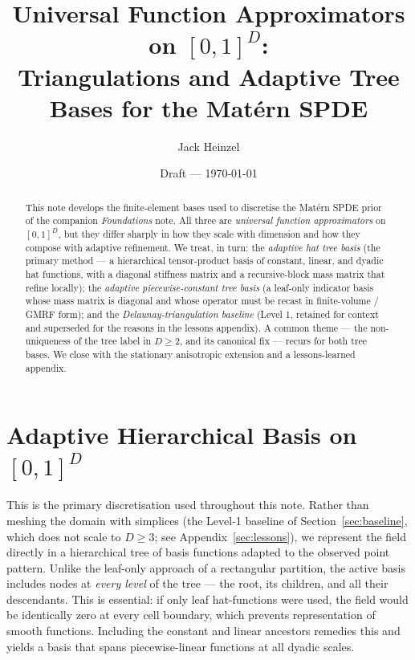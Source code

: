 \documentclass[11pt]{article}
\title{Universal Function Approximators on $[0,1]^D$:\\
Triangulations and Adaptive Tree Bases for the Mat\'ern SPDE}
\author{Jack Heinzel}
\date{Draft --- \today}
\begin{document}
\maketitle

\begin{abstract}
This note develops the finite-element bases used to discretise the Mat\'ern SPDE
prior of the companion \emph{Foundations} note.  All three are \emph{universal
function approximators} on $[0,1]^D$, but they differ sharply in how they scale
with dimension and how they compose with adaptive refinement.  We treat, in turn:
the \emph{adaptive hat tree basis} (the primary method --- a hierarchical
tensor-product basis of constant, linear, and dyadic hat functions, with a
diagonal stiffness matrix and a recursive-block mass matrix that refine locally);
the \emph{adaptive piecewise-constant tree basis} (a leaf-only indicator basis
whose mass matrix is diagonal and whose operator must be recast in finite-volume
/ GMRF form); and the \emph{Delaunay-triangulation baseline} (Level 1, retained
for context and superseded for the reasons in the lessons appendix).  A common
theme --- the non-uniqueness of the tree label in $D\ge2$, and its canonical
fix --- recurs for both tree bases.  We close with the stationary anisotropic
extension and a lessons-learned appendix.
\end{abstract}

\tableofcontents
\bigskip

\section{Adaptive Hierarchical Basis on $[0,1]^D$}
\label{sec:hat-tree}

This is the primary discretisation used throughout this note.  Rather than
meshing the domain with simplices (the Level-1 baseline of
Section~\ref{sec:baseline}, which does not scale to $D\ge 3$; see
Appendix~\ref{sec:lessons}), we represent the field directly in a
hierarchical tree of basis functions adapted to the observed point pattern.
Unlike the leaf-only approach of a rectangular partition, the active basis
includes nodes at \emph{every level} of the tree — the root, its children, and
all their descendants.  This is essential: if only leaf hat-functions were used,
the field would be identically zero at every cell boundary, which prevents
representation of smooth functions.  Including the constant and linear ancestors
remedies this and yields a basis that spans piecewise-linear functions at all
dyadic scales.
\end{document}
